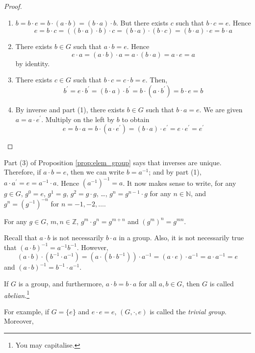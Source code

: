 \documentclass[10pt, a4paper, twoside]{report}
\begin{document}
\begin{proof} \item[] 
    \begin{enumerate}
        \item \(b=b\cdot e=b\cdot(a\cdot b)=(b\cdot a)\cdot b\). But there exists \(c\) such that \(b\cdot c=e\). Hence 
        \[e=b\cdot c=((b\cdot a)\cdot b)\cdot c=(b\cdot a)\cdot(b\cdot c)=(b\cdot a)\cdot e=b\cdot a\]
        \item There exists \(b\in G\) such that \(a\cdot b=e\). Hence 
        \[e\cdot a=(a\cdot b)\cdot a=a\cdot(b\cdot a)=a\cdot e=a\]
        by identity.
        \item There exists \(c\in G\) such that \(b\cdot c=c\cdot b=e\). Then,
        \[b^\prime=e\cdot b^\prime=(b\cdot a)\cdot b^\prime=b\cdot(a\cdot b^\prime)=b\cdot e=b\]
        \item By inverse and part (1), there exists \(b\in G\) such that \(b\cdot a=e\). We are given \(a=a\cdot e^\prime\). Multiply on the left by \(b\) to obtain
        \[e=b\cdot a=b\cdot(a\cdot e^\prime)=(b\cdot a)\cdot e^\prime=e\cdot e^\prime=e^\prime\]
    \end{enumerate}
\end{proof}
Part (3) of Proposition \ref{prop:elem_group} says that inverses are unique. Therefore, if \(a\cdot b=e\), then we can write \(b=a^{-1}\); and by part (1), \(a\cdot a^\prime=e=a^{-1}\cdot a\). Hence \((a^{-1})^{-1}=a\). It now makes sense to write, for any \(g\in G\), \(g^0=e\), \(g^1=g\), \(g^2=g\cdot g\), \ldots, \(g^n=g^{n-1}\cdot g\) for any \(n\in\mathbb{N}\), and \(g^n=(g^{-1})^{-n}\) for \(n=-1,-2,\ldots\).
\begin{example}
    For any \(g\in G\), \(m,n\in\mathbb{Z}\), \(g^m\cdot g^n=g^{m+n}\) and \((g^m)^n=g^{mn}\).
\end{example}
\begin{remark}
    Recall that \(a\cdot b\) is not necessarily \(b\cdot a\) in a group. Also, it is not necessarily true that \((a\cdot b)^{-1}=a^{-1}b^{-1}\). However, 
    \[(a\cdot b)\cdot(b^{-1}\cdot a^{-1})=(a\cdot(b\cdot b^{-1}))\cdot a^{-1}=(a\cdot e)\cdot a^{-1}=a\cdot a^{-1}=e\]
    and \((a\cdot b)^{-1}=b^{-1}\cdot a^{-1}\).
\end{remark}
\begin{definition}
    If \(G\) is a group, and furthermore, \(a\cdot b=b\cdot a\) for all \(a,b\in G\), then \(G\) is called \emph{abelian}.\footnote{You may capitalise.} 
\end{definition}
For example, if \(G=\{e\}\) and \(e\cdot e=e\), \((G,\cdot,e)\) is called the \emph{trivial group}. Moreover,
\end{document}
